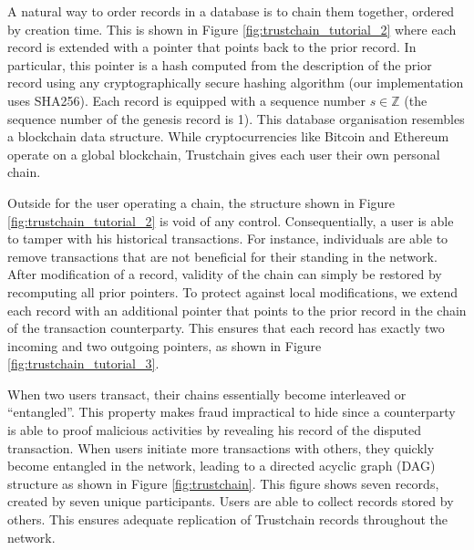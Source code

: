 A natural way to order records in a database is to chain them together, ordered by creation time.
This is shown in Figure \ref{fig:trustchain_tutorial_2} where each record is extended with a pointer that points back to the prior record.
In particular, this pointer is a hash computed from the description of the prior record using any cryptographically secure hashing algorithm (our implementation uses SHA256).
Each record is equipped with a sequence number $ s \in \mathbb{Z} $ (the sequence number of the genesis record is 1).
This database organisation resembles a blockchain data structure.
While cryptocurrencies like Bitcoin and Ethereum operate on a global blockchain, Trustchain gives each user their own personal chain.

Outside for the user operating a chain, the structure shown in Figure \ref{fig:trustchain_tutorial_2} is void of any control.
Consequentially, a user is able to tamper with his historical transactions.
For instance, individuals are able to remove transactions that are not beneficial for their standing in the network.
After modification of a record, validity of the chain can simply be restored by recomputing all prior pointers.
To protect against local modifications, we extend each record with an additional pointer that points to the prior record in the chain of the transaction counterparty.
This ensures that each record has exactly two incoming and two outgoing pointers, as shown in Figure \ref{fig:trustchain_tutorial_3}.

When two users transact, their chains essentially become interleaved or \enquote{entangled}.
This property makes fraud impractical to hide since a counterparty is able to proof malicious activities by revealing his record of the disputed transaction.
When users initiate more transactions with others, they quickly become entangled in the network, leading to a directed acyclic graph (DAG) structure as shown in Figure \ref{fig:trustchain}.
This figure shows seven records, created by seven unique participants.
Users are able to collect records stored by others.
This ensures adequate replication of Trustchain records throughout the network.

